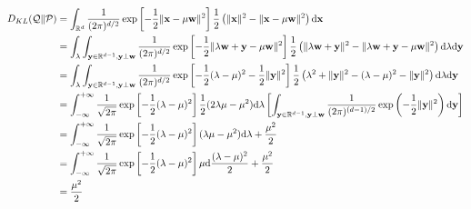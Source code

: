 \documentclass[8pt]{article}
\theoremstyle{compact}
\begin{document}
\begin{equation*}
	\begin{split}
		D_{KL}(\mathcal Q \| \mathcal P)
		&= \int_{\mathbb R^d}\frac{1}{(2\pi)^{d/2}}\exp\left[-\frac12\|\mathbf x - \mu\mathbf w\|^2\right]\frac12\left(\|\mathbf x\|^2 - \|\mathbf x - \mu\mathbf w\|^2\right)\text d\mathbf x\\
		&= \int_{\lambda}\int_{\mathbf y \in \mathbb R^{d-1}, \mathbf y \perp \mathbf w}\frac{1}{(2\pi)^{d/2}}\exp\left[-\frac12\|\lambda\mathbf w + \mathbf y - \mu\mathbf w\|^2\right]\frac12\left(\|\lambda\mathbf w + \mathbf y\|^2 - \|\lambda\mathbf w + \mathbf y - \mu\mathbf w\|^2\right)\text d\lambda\text d\mathbf y\\
		&= \int_{\lambda}\int_{\mathbf y \in \mathbb R^{d-1}, \mathbf y \perp \mathbf w}\frac{1}{(2\pi)^{d/2}}\exp\left[-\frac12(\lambda - \mu)^2 - \frac12 \|\mathbf y\|^2\right]\frac12\left(\lambda^2 + \|\mathbf y\|^2 - (\lambda - \mu)^2 - \|\mathbf y\|^2\right)\text d\lambda\text d\mathbf y\\
		&= \int_{-\infty}^{+\infty}\frac{1}{\sqrt{2\pi}}\exp\left[-\frac12(\lambda - \mu)^2\right]\frac12(2\lambda\mu - \mu^2)\text d\lambda\left[\int_{\mathbf y \in \mathbb R^{d-1}, \mathbf y \perp \mathbf w}\frac{1}{(2\pi)^{(d-1)/2}}\exp\left(-\frac12 \|\mathbf y\|^2\right)\text d\mathbf y\right]\\
		&= \int_{-\infty}^{+\infty}\frac{1}{\sqrt{2\pi}}\exp\left[-\frac12(\lambda - \mu)^2\right](\lambda\mu - \mu^2)\text d\lambda + \frac{\mu^2}{2}\\
		&=\int_{-\infty}^{+\infty}\frac{1}{\sqrt{2\pi}}\exp\left[-\frac12(\lambda - \mu)^2\right]\mu\text d\frac{(\lambda - \mu)^2}{2} + \frac{\mu^2}{2}\\
		&= \frac{\mu^2}{2}
	\end{split}
\end{equation*}












\newpage
\end{document}
